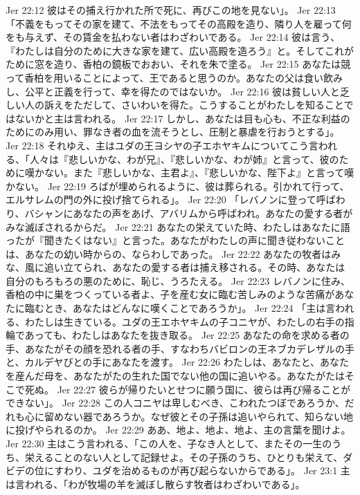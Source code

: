 Jer 22:12  彼はその捕え行かれた所で死に、再びこの地を見ない」。
Jer 22:13  「不義をもってその家を建て、不法をもってその高殿を造り、隣り人を雇って何をも与えず、その賃金を払わない者はわざわいである。
Jer 22:14  彼は言う、『わたしは自分のために大きな家を建て、広い高殿を造ろう』と。そしてこれがために窓を造り、香柏の鏡板でおおい、それを朱で塗る。
Jer 22:15  あなたは競って香柏を用いることによって、王であると思うのか。あなたの父は食い飲みし、公平と正義を行って、幸を得たのではないか。
Jer 22:16  彼は貧しい人と乏しい人の訴えをただして、さいわいを得た。こうすることがわたしを知ることではないかと主は言われる。
Jer 22:17  しかし、あなたは目も心も、不正な利益のためにのみ用い、罪なき者の血を流そうとし、圧制と暴虐を行おうとする」。
Jer 22:18  それゆえ、主はユダの王ヨシヤの子エホヤキムについてこう言われる、「人々は『悲しいかな、わが兄』、『悲しいかな、わが姉』と言って、彼のために嘆かない。また『悲しいかな、主君よ』、『悲しいかな、陛下よ』と言って嘆かない。
Jer 22:19  ろばが埋められるように、彼は葬られる。引かれて行って、エルサレムの門の外に投げ捨てられる」。
Jer 22:20  「レバノンに登って呼ばわり、バシャンにあなたの声をあげ、アバリムから呼ばわれ。あなたの愛する者がみな滅ぼされるからだ。
Jer 22:21  あなたの栄えていた時、わたしはあなたに語ったが『聞きたくはない』と言った。あなたがわたしの声に聞き従わないことは、あなたの幼い時からの、ならわしであった。
Jer 22:22  あなたの牧者はみな、風に追い立てられ、あなたの愛する者は捕え移される。その時、あなたは自分のもろもろの悪のために、恥じ、うろたえる。
Jer 22:23  レバノンに住み、香柏の中に巣をつくっている者よ、子を産む女に臨む苦しみのような苦痛があなたに臨むとき、あなたはどんなに嘆くことであろうか」。
Jer 22:24  「主は言われる、わたしは生きている。ユダの王エホヤキムの子コニヤが、わたしの右手の指輪であっても、わたしはあなたを抜き取る。
Jer 22:25  あなたの命を求める者の手、あなたがその顔を恐れる者の手、すなわちバビロンの王ネブカデレザルの手と、カルデヤびとの手にあなたを渡す。
Jer 22:26  わたしは、あなたと、あなたを産んだ母を、あなたがたの生れた国でない他の国に追いやる。あなたがたはそこで死ぬ。
Jer 22:27  彼らが帰りたいとせつに願う国に、彼らは再び帰ることができない」。
Jer 22:28  この人コニヤは卑しむべき、こわれたつぼであろうか、だれも心に留めない器であろうか。なぜ彼とその子孫は追いやられて、知らない地に投げやられるのか。
Jer 22:29  ああ、地よ、地よ、地よ、主の言葉を聞けよ。
Jer 22:30  主はこう言われる、「この人を、子なき人として、またその一生のうち、栄えることのない人として記録せよ。その子孫のうち、ひとりも栄えて、ダビデの位にすわり、ユダを治めるものが再び起らないからである」。
Jer 23:1  主は言われる、「わが牧場の羊を滅ぼし散らす牧者はわざわいである」。
